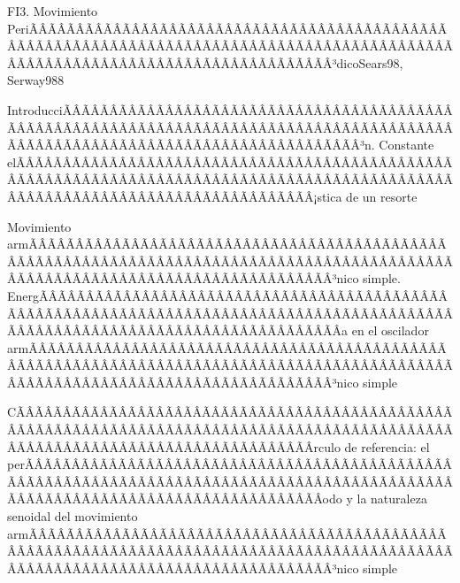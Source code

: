 \begin{sumilla}
\begin{unit}{FI3. Movimiento PeriÃÂÃÂÃÂÃÂÃÂÃÂÃÂÃÂÃÂÃÂÃÂÃÂÃÂÃÂÃÂÃÂÃÂÃÂÃÂÃÂÃÂÃÂÃÂÃÂÃÂÃÂÃÂÃÂÃÂÃÂÃÂÃÂÃÂÃÂÃÂÃÂÃÂÃÂÃÂÃÂÃÂÃÂÃÂÃÂÃÂÃÂÃÂÃÂÃÂÃÂÃÂÃÂÃÂÃÂÃÂÃÂÃÂÃÂÃÂÃÂÃÂÃÂÃÂÃÂ³dico}{Sears98, Serway98}{8}
\begin{topicos}
         \item  IntroducciÃÂÃÂÃÂÃÂÃÂÃÂÃÂÃÂÃÂÃÂÃÂÃÂÃÂÃÂÃÂÃÂÃÂÃÂÃÂÃÂÃÂÃÂÃÂÃÂÃÂÃÂÃÂÃÂÃÂÃÂÃÂÃÂÃÂÃÂÃÂÃÂÃÂÃÂÃÂÃÂÃÂÃÂÃÂÃÂÃÂÃÂÃÂÃÂÃÂÃÂÃÂÃÂÃÂÃÂÃÂÃÂÃÂÃÂÃÂÃÂÃÂÃÂÃÂÃÂ³n. Constante elÃÂÃÂÃÂÃÂÃÂÃÂÃÂÃÂÃÂÃÂÃÂÃÂÃÂÃÂÃÂÃÂÃÂÃÂÃÂÃÂÃÂÃÂÃÂÃÂÃÂÃÂÃÂÃÂÃÂÃÂÃÂÃÂÃÂÃÂÃÂÃÂÃÂÃÂÃÂÃÂÃÂÃÂÃÂÃÂÃÂÃÂÃÂÃÂÃÂÃÂÃÂÃÂÃÂÃÂÃÂÃÂÃÂÃÂÃÂÃÂÃÂÃÂÃÂÃÂ¡stica de un resorte
	 \item  Movimiento armÃÂÃÂÃÂÃÂÃÂÃÂÃÂÃÂÃÂÃÂÃÂÃÂÃÂÃÂÃÂÃÂÃÂÃÂÃÂÃÂÃÂÃÂÃÂÃÂÃÂÃÂÃÂÃÂÃÂÃÂÃÂÃÂÃÂÃÂÃÂÃÂÃÂÃÂÃÂÃÂÃÂÃÂÃÂÃÂÃÂÃÂÃÂÃÂÃÂÃÂÃÂÃÂÃÂÃÂÃÂÃÂÃÂÃÂÃÂÃÂÃÂÃÂÃÂÃÂ³nico simple. EnergÃÂÃÂÃÂÃÂÃÂÃÂÃÂÃÂÃÂÃÂÃÂÃÂÃÂÃÂÃÂÃÂÃÂÃÂÃÂÃÂÃÂÃÂÃÂÃÂÃÂÃÂÃÂÃÂÃÂÃÂÃÂÃÂÃÂÃÂÃÂÃÂÃÂÃÂÃÂÃÂÃÂÃÂÃÂÃÂÃÂÃÂÃÂÃÂÃÂÃÂÃÂÃÂÃÂÃÂÃÂÃÂÃÂÃÂÃÂÃÂÃÂÃÂÃÂÃÂ­a en el oscilador armÃÂÃÂÃÂÃÂÃÂÃÂÃÂÃÂÃÂÃÂÃÂÃÂÃÂÃÂÃÂÃÂÃÂÃÂÃÂÃÂÃÂÃÂÃÂÃÂÃÂÃÂÃÂÃÂÃÂÃÂÃÂÃÂÃÂÃÂÃÂÃÂÃÂÃÂÃÂÃÂÃÂÃÂÃÂÃÂÃÂÃÂÃÂÃÂÃÂÃÂÃÂÃÂÃÂÃÂÃÂÃÂÃÂÃÂÃÂÃÂÃÂÃÂÃÂÃÂ³nico simple
         \item  CÃÂÃÂÃÂÃÂÃÂÃÂÃÂÃÂÃÂÃÂÃÂÃÂÃÂÃÂÃÂÃÂÃÂÃÂÃÂÃÂÃÂÃÂÃÂÃÂÃÂÃÂÃÂÃÂÃÂÃÂÃÂÃÂÃÂÃÂÃÂÃÂÃÂÃÂÃÂÃÂÃÂÃÂÃÂÃÂÃÂÃÂÃÂÃÂÃÂÃÂÃÂÃÂÃÂÃÂÃÂÃÂÃÂÃÂÃÂÃÂÃÂÃÂÃÂÃÂ­rculo de referencia: el perÃÂÃÂÃÂÃÂÃÂÃÂÃÂÃÂÃÂÃÂÃÂÃÂÃÂÃÂÃÂÃÂÃÂÃÂÃÂÃÂÃÂÃÂÃÂÃÂÃÂÃÂÃÂÃÂÃÂÃÂÃÂÃÂÃÂÃÂÃÂÃÂÃÂÃÂÃÂÃÂÃÂÃÂÃÂÃÂÃÂÃÂÃÂÃÂÃÂÃÂÃÂÃÂÃÂÃÂÃÂÃÂÃÂÃÂÃÂÃÂÃÂÃÂÃÂÃÂ­odo y la naturaleza senoidal del movimiento armÃÂÃÂÃÂÃÂÃÂÃÂÃÂÃÂÃÂÃÂÃÂÃÂÃÂÃÂÃÂÃÂÃÂÃÂÃÂÃÂÃÂÃÂÃÂÃÂÃÂÃÂÃÂÃÂÃÂÃÂÃÂÃÂÃÂÃÂÃÂÃÂÃÂÃÂÃÂÃÂÃÂÃÂÃÂÃÂÃÂÃÂÃÂÃÂÃÂÃÂÃÂÃÂÃÂÃÂÃÂÃÂÃÂÃÂÃÂÃÂÃÂÃÂÃÂÃÂ³nico simple

\end{topicos}
\end{unit}
\end{sumilla}
